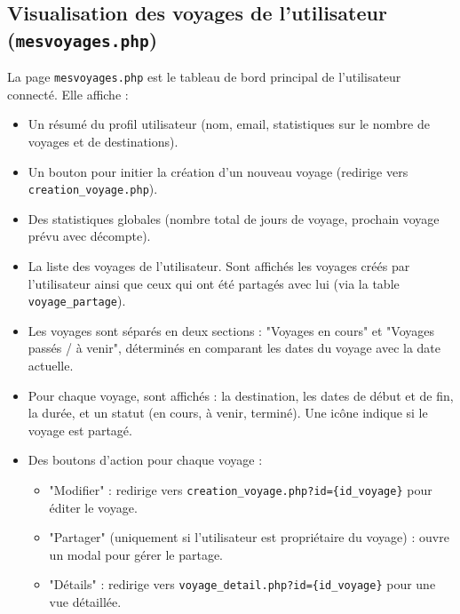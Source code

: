 \documentclass[a4paper,12pt]{article}
\begin{document}
\subsection{Visualisation des voyages de l'utilisateur (\texttt{mesvoyages.php})}
La page \texttt{mesvoyages.php} est le tableau de bord principal de l'utilisateur connecté. Elle affiche :
\begin{itemize}
  \item Un résumé du profil utilisateur (nom, email, statistiques sur le nombre de voyages et de destinations).
  \item Un bouton pour initier la création d'un nouveau voyage (redirige vers \texttt{creation\_voyage.php}).
  \item Des statistiques globales (nombre total de jours de voyage, prochain voyage prévu avec décompte).
  \item La liste des voyages de l'utilisateur. Sont affichés les voyages créés par l'utilisateur ainsi que ceux qui ont été partagés avec lui (via la table \texttt{voyage\_partage}).
  \item Les voyages sont séparés en deux sections : "Voyages en cours" et "Voyages passés / à venir", déterminés en comparant les dates du voyage avec la date actuelle.
  \item Pour chaque voyage, sont affichés : la destination, les dates de début et de fin, la durée, et un statut (en cours, à venir, terminé). Une icône indique si le voyage est partagé.
  \item Des boutons d'action pour chaque voyage :
    \begin{itemize}
        \item "Modifier" : redirige vers \texttt{creation\_voyage.php?id=\{id\_voyage\}} pour éditer le voyage.
        \item "Partager" (uniquement si l'utilisateur est propriétaire du voyage) : ouvre un modal pour gérer le partage.
        \item "Détails" : redirige vers \texttt{voyage\_detail.php?id=\{id\_voyage\}} pour une vue détaillée.
    \end{itemize}
\end{itemize}
\end{document}
